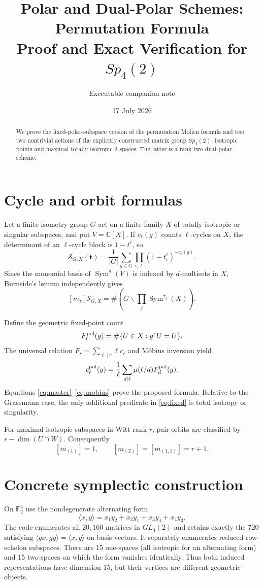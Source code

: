 \documentclass[11pt]{article}
\title{Polar and Dual-Polar Schemes: Permutation Formula\\Proof and Exact Verification for $Sp_4(2)$}
\author{Executable companion note}
\date{17 July 2026}
\newcommand{\Sym}{\operatorname{Sym}}
\newcommand{\cS}{\mathcal S}
\begin{document}
\maketitle
\begin{abstract}
We prove the fixed-polar-subspace version of the permutation Molien formula
and test two nontrivial actions of the explicitly constructed matrix group
$Sp_4(2)$: isotropic points and maximal totally isotropic $2$-spaces.  The
latter is a rank-two dual-polar scheme.
\end{abstract}

\section{Cycle and orbit formulas}
Let a finite isometry group $G$ act on a finite family $X$ of totally
isotropic or singular subspaces, and put $V=\mathbb C[X]$.  If $c_\ell(g)$
counts $\ell$-cycles on $X$, the determinant of an $\ell$-cycle block is
$1-t^\ell$, so
\begin{equation}\label{eq:master}
\cS_{G,X}(\mathbf t)=\frac1{|G|}\sum_{g\in G}
\prod_{i,\ell}(1-t_i^\ell)^{-c_\ell(g)}.
\end{equation}
Since the monomial basis of $\Sym^d(V)$ is indexed by $d$-multisets in $X$,
Burnside's lemma independently gives
\begin{equation}\label{eq:orbit}
[m_\tau]\cS_{G,X}=\#\left(G\backslash\prod_j\Sym^{\tau_j}(X)\right).
\end{equation}

Define the geometric fixed-point count
\begin{equation}\label{eq:fixed}
F_r^{\rm pol}(g)=\#\{U\in X:g^rU=U\}.
\end{equation}
The universal relation $F_r=\sum_{\ell\mid r}\ell c_\ell$ and Möbius
inversion yield
\begin{equation}\label{eq:mobius}
c_\ell^{\rm pol}(g)=\frac1\ell\sum_{d\mid\ell}
\mu(\ell/d)F_d^{\rm pol}(g).
\end{equation}
Equations \eqref{eq:master}--\eqref{eq:mobius} prove the proposed formula.
Relative to the Grassmann case, the only additional predicate in
\eqref{eq:fixed} is total isotropy or singularity.

For maximal isotropic subspaces in Witt rank $r$, pair orbits are classified
by $r-\dim(U\cap W)$.  Consequently
\[
[m_{(1)}]=1,\qquad [m_{(2)}]=[m_{(1,1)}]=r+1.
\]

\section{Concrete symplectic construction}
On $\mathbb F_2^4$ use the nondegenerate alternating form
\[
\langle x,y\rangle=x_1y_2+x_2y_1+x_3y_4+x_4y_3.
\]
The code enumerates all $20{,}160$ matrices in $GL_4(2)$ and retains exactly
the 720 satisfying $\langle gx,gy\rangle=\langle x,y\rangle$ on basis
vectors.  It separately enumerates reduced-row-echelon subspaces.  There are
15 one-spaces (all isotropic for an alternating form) and 15 two-spaces on
which the form vanishes identically.  Thus both induced representations have
dimension 15, but their vertices are different geometric objects.
\end{document}
